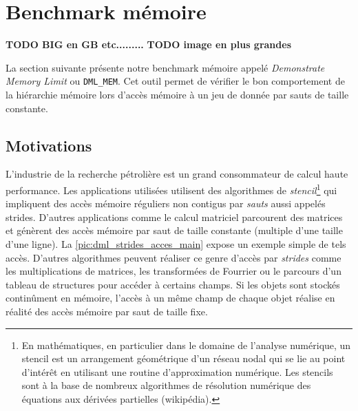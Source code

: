 \section{Benchmark mémoire}\label{sec:dmlmem}


\textbf{TODO BIG en GB etc.........}
\textbf{TODO image en plus grandes}

    La section suivante présente notre benchmark mémoire appelé \textit{Demonstrate Memory Limit} ou \verb=DML_MEM=. Cet outil permet de vérifier le bon comportement de la hiérarchie mémoire lors d'accès mémoire à un jeu de donnée par sauts de taille constante. 

    

    \subsection{Motivations}
    
        L'industrie de la recherche pétrolière est un grand consommateur de calcul haute performance. Les applications utilisées utilisent des algorithmes de \textit{stencil}\footnote{En mathématiques, en particulier dans le domaine de l'analyse numérique, un stencil est un arrangement géométrique d'un réseau nodal qui se lie au point d'intérêt en utilisant une routine d'approximation numérique. Les stencils sont à la base de nombreux algorithmes de résolution numérique des équations aux dérivées partielles (wikipédia).} qui impliquent des accès mémoire réguliers non contigus par \textit{sauts} aussi appelés \glspl{stride}. D'autres applications comme le calcul matriciel parcourent des matrices et génèrent des accès mémoire par saut de taille constante (multiple d'une taille d'une ligne). La \autoref{pic:dml_strides_acces_main} expose un exemple simple de tels accès. D'autres algorithmes peuvent réaliser ce genre d'accès par \textit{strides} comme les multiplications de matrices, les transformées de Fourrier ou le parcours d'un tableau de structures pour accéder à certains champs. Si les objets sont stockés continûment en mémoire, l'accès à un même champ de chaque objet réalise en réalité des accès mémoire par saut de taille fixe. 
        
